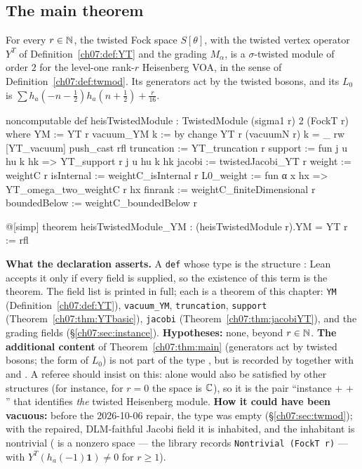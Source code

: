 \subsection{The main theorem}

\begin{theorem}\label{ch07:thm:main}
For every $r\in{\mathbb{N}}$, the twisted Fock space $S[\theta]$, with the twisted vertex operator $Y^T$ of
Definition~\ref{ch07:def:YT} and the grading $M_\alpha$, is a $\sigma$-twisted module of order $2$
for the level-one rank-$r$ Heisenberg VOA, in the sense of Definition~\ref{ch07:def:twmod}. Its
generators act by the twisted bosons, and its $L_0$ is $\sum h_a(-n-\frac12)h_a(n+\frac12) +
\frac r{16}$.
\end{theorem}

\begin{leancode}
noncomputable def heisTwistedModule : TwistedModule (sigma1 r) 2 (FockT r) where
  YM := YT r
  vacuum_YM k := by
    change YT r (vacuumN r) k = _
    rw [YT_vacuum]
    push_cast
    rfl
  truncation := YT_truncation r
  support := fun j u hu k hk => YT_support r j u hu k hk
  jacobi := twistedJacobi_YT r
  weight := weightC r
  isInternal := weightC_isInternal r
  L0_weight := fun α x hx => YT_omega_two_weightC r hx
  finrank := weightC_finiteDimensional r
  boundedBelow := weightC_boundedBelow r

@[simp] theorem heisTwistedModule_YM : (heisTwistedModule r).YM = YT r := rfl
\end{leancode}

\begin{dictionary}
\textbf{What the declaration asserts.} A \verb|def| whose type is the structure
: Lean accepts it only if every field is supplied, so
the existence of this term is the theorem. The field list is printed in full; each is a theorem
of this chapter: \verb|YM| (Definition~\ref{ch07:def:YT}), \verb|vacuum_YM|, \verb|truncation|,
\verb|support| (Theorem~\ref{ch07:thm:YTbasic}), \verb|jacobi|
(Theorem~\ref{ch07:thm:jacobiYT}), and the grading fields (\S\ref{ch07:sec:instance}).
\textbf{Hypotheses:} none, beyond $r\in{\mathbb{N}}$. \textbf{The additional content} of
Theorem~\ref{ch07:thm:main} (generators act by twisted bosons; the form of $L_0$) is not part of
the type , but is recorded by  together with
 and . A referee should insist on this:  alone
would also be satisfied by other structures (for instance, for $r=0$ the space is
${\mathbb{C}}$), so it is the pair ``instance $+$  $+$ '' that identifies
\emph{the} twisted Heisenberg module. \textbf{How it could have been vacuous:} before the
2026-10-06 repair, the type  was empty
(\S\ref{ch07:sec:twmod}); with the repaired, DLM-faithful Jacobi field it is inhabited, and the
inhabitant is nontrivial ( is a nonzero space --- the library records
\verb|Nontrivial (FockT r)| --- with $Y^T(h_a(-1)\mathbf 1)\ne0$ for $r\ge1$).
\end{dictionary}

